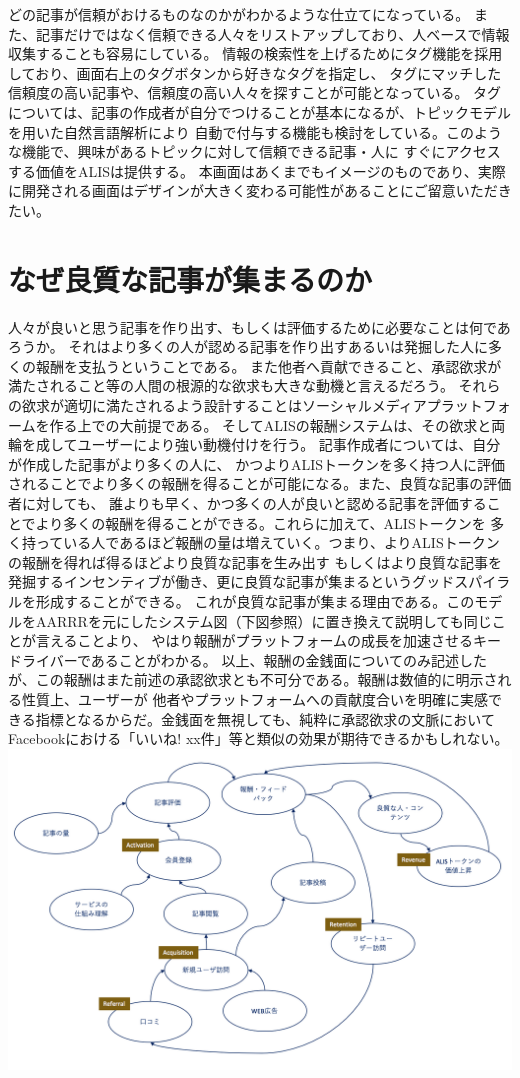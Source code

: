 \documentclass{jsarticle}
\begin{document}
どの記事が信頼がおけるものなのかがわかるような仕立てになっている。
また、記事だけではなく信頼できる人々をリストアップしており、人ベースで情報収集することも容易にしている。
情報の検索性を上げるためにタグ機能を採用しており、画面右上のタグボタンから好きなタグを指定し、
タグにマッチした信頼度の高い記事や、信頼度の高い人々を探すことが可能となっている。
タグについては、記事の作成者が自分でつけることが基本になるが、トピックモデルを用いた自然言語解析により
自動で付与する機能も検討をしている。このような機能で、興味があるトピックに対して信頼できる記事・人に
すぐにアクセスする価値をALISは提供する。
本画面はあくまでもイメージのものであり、実際に開発される画面はデザインが大きく変わる可能性があることにご留意いただきたい。

\section{なぜ良質な記事が集まるのか}
人々が良いと思う記事を作り出す、もしくは評価するために必要なことは何であろうか。  
それはより多くの人が認める記事を作り出すあるいは発掘した人に多くの報酬を支払うということである。
また他者へ貢献できること、承認欲求が満たされること等の人間の根源的な欲求も大きな動機と言えるだろう。
それらの欲求が適切に満たされるよう設計することはソーシャルメディアプラットフォームを作る上での大前提である。
そしてALISの報酬システムは、その欲求と両輪を成してユーザーにより強い動機付けを行う。
記事作成者については、自分が作成した記事がより多くの人に、
かつよりALISトークンを多く持つ人に評価されることでより多くの報酬を得ることが可能になる。また、良質な記事の評価者に対しても、
誰よりも早く、かつ多くの人が良いと認める記事を評価することでより多くの報酬を得ることができる。これらに加えて、ALISトークンを
多く持っている人であるほど報酬の量は増えていく。つまり、よりALISトークンの報酬を得れば得るほどより良質な記事を生み出す
もしくはより良質な記事を発掘するインセンティブが働き、更に良質な記事が集まるというグッドスパイラルを形成することができる。
これが良質な記事が集まる理由である。このモデルをAARRRを元にしたシステム図（下図参照）に置き換えて説明しても同じことが言えることより、
やはり報酬がプラットフォームの成長を加速させるキードライバーであることがわかる。
以上、報酬の金銭面についてのみ記述したが、この報酬はまた前述の承認欲求とも不可分である。報酬は数値的に明示される性質上、ユーザーが
他者やプラットフォームへの貢献度合いを明確に実感できる指標となるからだ。金銭面を無視しても、純粋に承認欲求の文脈において
Facebookにおける「いいね! xx件」等と類似の効果が期待できるかもしれない。
	\includegraphics[scale=0.6]{img/systemthinking-with-AARRR.png}
\end{document}
